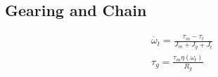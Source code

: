 \documentclass[../SimBALink.tex]{subfiles}
\begin{document}
\subsection{Gearing and Chain}

\begin{gather}
\dot{\omega_t} = \frac{\tau_m - \tau_t}{J_m + J_g + J_t} \\
\tau_g = \frac{\tau_m \eta (\omega_t)}{R_g}
\end{gather}
\end{document}
